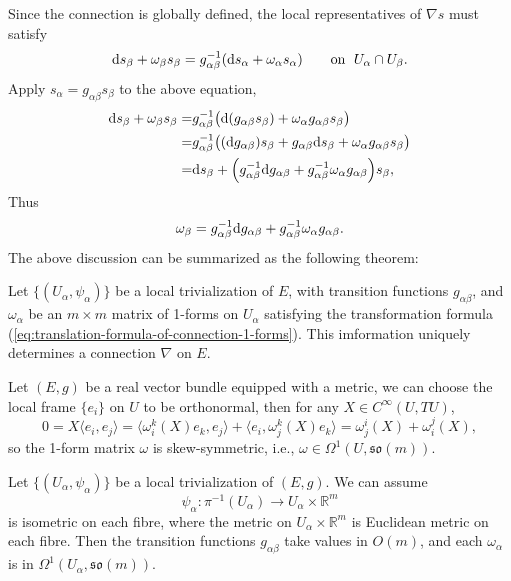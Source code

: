 Since the connection is globally defined, the local representatives of $\nabla s$ must satisfy
\begin{equation*}
    {\rm d} s_\beta + \omega_\beta s_\beta = g_{\alpha\beta}^{-1}({\rm d} s_\alpha + \omega_\alpha s_\alpha) 
    \qquad \text{on }\; U_\alpha\cap U_\beta.
\end{equation*}
Apply $s_\alpha = g_{\alpha\beta} s_\beta$ to the above equation, 
\begin{align*}
    {\rm d} s_\beta + \omega_\beta s_\beta 
    =& g_{\alpha\beta}^{-1}\big({\rm d} (g_{\alpha\beta} s_\beta) + \omega_\alpha g_{\alpha\beta} s_\beta\big) \\
    =& g_{\alpha\beta}^{-1}\big(({\rm d} g_{\alpha\beta}) s_\beta + g_{\alpha\beta} {\rm d} s_\beta + \omega_\alpha g_{\alpha\beta} s_\beta\big) \\
    =& {\rm d} s_\beta + \Big(g_{\alpha\beta}^{-1}{\rm d} g_{\alpha\beta} + g_{\alpha\beta}^{-1}\omega_\alpha g_{\alpha\beta}\Big) s_\beta,    
\end{align*}
Thus 
\begin{equation}\label{eq:translation-formula-of-connection-1-forms}
    \omega_\beta = g_{\alpha\beta}^{-1}{\rm d} g_{\alpha\beta} + g_{\alpha\beta}^{-1}\omega_\alpha g_{\alpha\beta}.
\end{equation}
The above discussion can be summarized as the following theorem:
\begin{theorem}
    Let $\{(U_\alpha,\psi_\alpha)\}$ be a local trivialization of $E$, with transition functions $g_{\alpha\beta}$, 
    and $\omega_\alpha$ be an $m\times m$ matrix of 1-forms on $U_\alpha$ 
    satisfying the transformation formula {\rm(}\ref{eq:translation-formula-of-connection-1-forms}{\rm)}. 
    This imformation uniquely determines a connection $\nabla$ on $E$. 
\end{theorem}

Let $(E,g)$ be a real vector bundle equipped with a metric, we can choose the local frame $\{e_i\}$ on $U$ to be orthonormal, 
then for any $X\in C^{\infty}(U, TU)$, 
\begin{equation*}
    0=X\langle e_i, e_j\rangle=\langle\omega_i^k(X)e_k, e_j\rangle + \langle e_i, \omega_j^k(X)e_k\rangle = \omega_j^i(X) + \omega_i^j(X),
\end{equation*}
so the 1-form matrix $\omega$ is skew-symmetric, i.e., $\omega \in \Omega^1(U,\mathfrak{so}(m))$. 

Let $\{(U_\alpha,\psi_\alpha)\}$ be a local trivialization of $(E,g)$. We can assume 
\begin{equation*}
    \psi_\alpha: \pi^{-1}(U_\alpha) \to U_\alpha \times \mathbb{R}^m
\end{equation*}
is isometric on each fibre, where the metric on $U_\alpha\times\mathbb{R}^m$ is Euclidean metric on each fibre. 
Then the transition functions $g_{\alpha\beta}$ take values in $O(m)$, 
and each $\omega_\alpha$ is in $\Omega^1(U_\alpha,\mathfrak{so}(m))$. 

